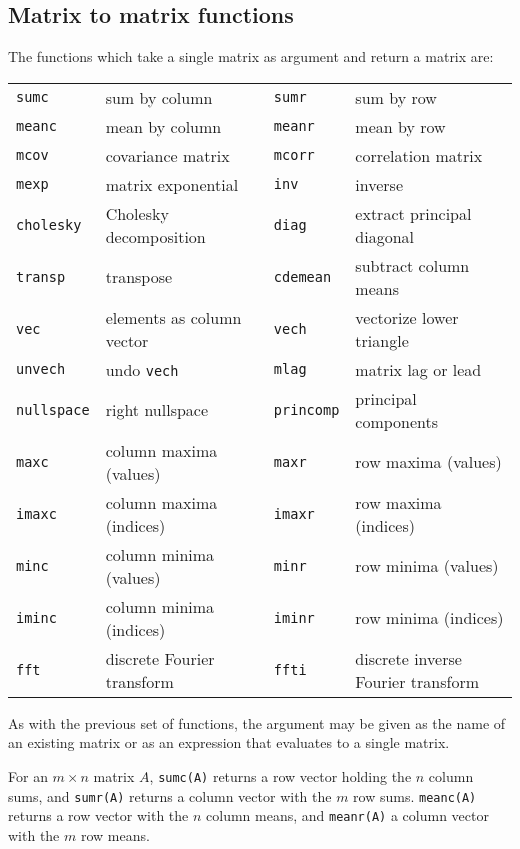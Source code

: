 \subsection{Matrix to matrix functions}
\label{matrix-to-matrix}

The functions which take a single matrix as argument and return a
matrix are:

\begin{center}
\begin{tabular}{llcll}
\texttt{sumc}    & sum by column & &
\texttt{sumr}    & sum by row \\
\texttt{meanc}   & mean by column & &
\texttt{meanr}   & mean by row \\
\texttt{mcov}    & covariance matrix & &
\texttt{mcorr}   & correlation matrix \\
\texttt{mexp}    & matrix exponential & &
\texttt{inv}     & inverse \\
\texttt{cholesky} & Cholesky decomposition & &
\texttt{diag}    & extract principal diagonal \\
\texttt{transp}  & transpose & &
\texttt{cdemean} & subtract column means \\ 
\texttt{vec}     & elements as column vector & &
\texttt{vech}    & vectorize lower triangle \\
\texttt{unvech}  & undo \texttt{vech} & &
\texttt{mlag}    & matrix lag or lead \\
\texttt{nullspace} & right nullspace & &
\texttt{princomp} & principal components \\
\texttt{maxc}      & column maxima (values) & &
\texttt{maxr}      & row maxima (values) \\
\texttt{imaxc}     & column maxima (indices) & &
\texttt{imaxr}     & row maxima (indices) \\
\texttt{minc}      & column minima (values) & &
\texttt{minr}      & row minima (values) \\
\texttt{iminc}     & column minima (indices) & &
\texttt{iminr}     & row minima (indices) \\
\texttt{fft}       & discrete Fourier transform & &
\texttt{ffti}      & discrete inverse Fourier transform 
\end{tabular}
\end{center}

As with the previous set of functions, the argument may be given as
the name of an existing matrix or as an expression that evaluates to a
single matrix.

For an $m \times n$ matrix $A$, \texttt{sumc(A)} returns a row vector
holding the $n$ column sums, and \texttt{sumr(A)} returns a column
vector with the $m$ row sums.  \texttt{meanc(A)} returns a row vector
with the $n$ column means, and \texttt{meanr(A)} a column vector with
the $m$ row means.

